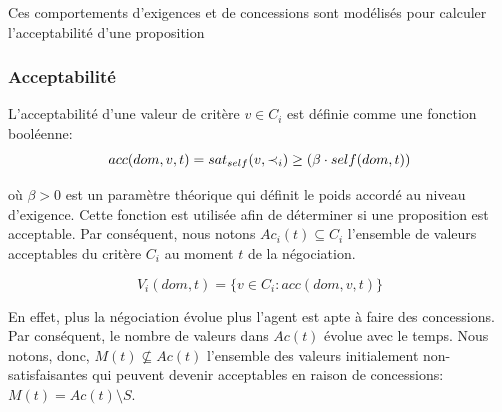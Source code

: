 		
	Ces comportements d'exigences et de concessions sont modélisés pour calculer l'acceptabilité d'une proposition 
	
	\subsubsection{Acceptabilité }
	L'acceptabilité d'une valeur de critère $v \in C_i$ est définie comme une fonction booléenne:
	\begin{equation}
	\vspace{0.5em}
	acc(dom,v, t) = sat_{self}(v, \prec_i) \geq  (\beta \cdot self(dom,t))
	\end{equation}
	
	\medskip
	où $\beta>0$ est un paramètre théorique qui définit le poids accordé au niveau d'exigence. Cette fonction est utilisée afin de déterminer si une proposition est acceptable. Par conséquent, nous notons $Ac_i(t) \subseteq C_i $ l'ensemble de valeurs acceptables du critère $C_i$ au moment $t$ de la négociation. 
	
	\begin{equation}
	V_i(dom,t) = \{ v\in C_i : acc(dom,v,t) \}
	\end{equation}
	
	En effet, plus la négociation évolue plus l'agent est apte à faire des concessions. Par conséquent, le nombre de valeurs dans $Ac(t)$ évolue avec le temps. Nous notons, donc, $M(t) \not \subseteq Ac(t)$ l'ensemble des valeurs initialement non-satisfaisantes qui peuvent devenir acceptables en raison de concessions: $M(t)=Ac(t)\setminus S$.
	
%
	
